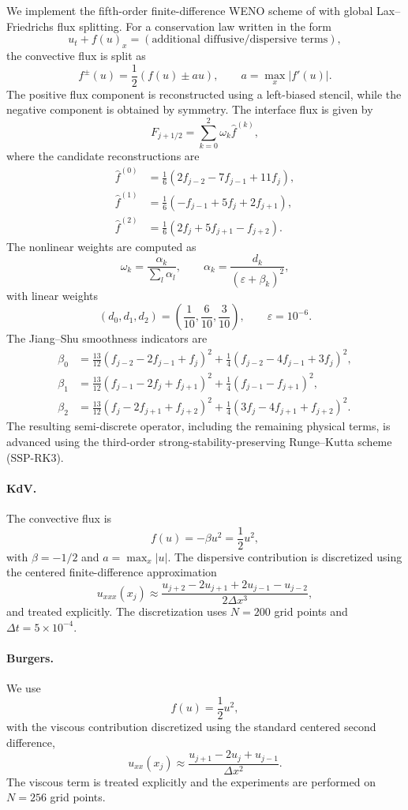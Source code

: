 \documentclass[letterpaper]{article} %
\begin{document}
We implement the fifth-order finite-difference WENO scheme of
\citet{jiang1996efficient} with global Lax--Friedrichs flux splitting. For a
conservation law written in the form
\[
u_t + f(u)_x = (\text{additional diffusive/dispersive terms}),
\]
the convective flux is split as
\[
f^{\pm}(u)=\frac12\left(f(u)\pm a u\right),
\qquad
a=\max_x |f'(u)|.
\]
The positive flux component is reconstructed using a left-biased stencil,
while the negative component is obtained by symmetry. The interface flux is
given by
\[
F_{j+1/2}=\sum_{k=0}^{2}\omega_k\hat f^{(k)},
\]
where the candidate reconstructions are
\begin{align*}
\hat f^{(0)}
&=\frac16(2f_{j-2}-7f_{j-1}+11f_j),\\
\hat f^{(1)}
&=\frac16(-f_{j-1}+5f_j+2f_{j+1}),\\
\hat f^{(2)}
&=\frac16(2f_j+5f_{j+1}-f_{j+2}).
\end{align*}
The nonlinear weights are computed as
\[
\omega_k=\frac{\alpha_k}{\sum_l\alpha_l},
\qquad
\alpha_k=\frac{d_k}{(\varepsilon+\beta_k)^2},
\]
with linear weights
\[
(d_0,d_1,d_2)=
\left(\frac1{10},\frac6{10},\frac3{10}\right),
\qquad
\varepsilon=10^{-6}.
\]
The Jiang--Shu smoothness indicators are
\begin{align*}
\beta_0 &=
\frac{13}{12}(f_{j-2}-2f_{j-1}+f_j)^2
+\frac14(f_{j-2}-4f_{j-1}+3f_j)^2,\\
\beta_1 &=
\frac{13}{12}(f_{j-1}-2f_j+f_{j+1})^2
+\frac14(f_{j-1}-f_{j+1})^2,\\
\beta_2 &=
\frac{13}{12}(f_j-2f_{j+1}+f_{j+2})^2
+\frac14(3f_j-4f_{j+1}+f_{j+2})^2 .
\end{align*}
The resulting semi-discrete operator, including the remaining physical terms,
is advanced using the third-order strong-stability-preserving Runge--Kutta
scheme (SSP-RK3).

\paragraph{KdV.}
The convective flux is
\[
f(u)=-\beta u^2=\frac12u^2,
\]
with $\beta=-1/2$ and
$a=\max_x|u|$. The dispersive contribution is discretized using the centered
finite-difference approximation
\[
u_{xxx}(x_j)\approx
\frac{
u_{j+2}-2u_{j+1}+2u_{j-1}-u_{j-2}
}
{2\Delta x^3},
\]
and treated explicitly. The discretization uses $N=200$ grid points and
$\Delta t=5\times10^{-4}$.

\paragraph{Burgers.}
We use
\[
f(u)=\frac12u^2,
\]
with the viscous contribution discretized using the standard centered second
difference,
\[
u_{xx}(x_j)\approx
\frac{u_{j+1}-2u_j+u_{j-1}}{\Delta x^2}.
\]
The viscous term is treated explicitly and the experiments are performed on
$N=256$ grid points.
\end{document}
